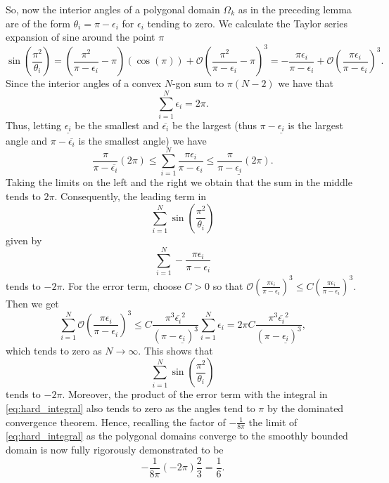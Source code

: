 \documentclass{amsart}
\theoremstyle{definition}
\begin{document}
So, now the interior angles of a polygonal domain $\Omega_k$ as in the preceding lemma are of the form $\theta_i = \pi - \epsilon_i$ for $\epsilon_i$ tending to zero.  We calculate the Taylor series expansion of sine around the point $\pi$ 
\[\sin\left( \frac{\pi^2}{\theta_i} \right)=  \left( \frac{\pi^2}{\pi - \epsilon_i} - \pi \right)(\cos(\pi)) + \mathcal O \left( \frac{\pi^2}{\pi - \epsilon_i} - \pi \right)^3 = - \frac{\pi \epsilon_i}{\pi - \epsilon_i} + \mathcal O \left( \frac{\pi \epsilon_i}{\pi - \epsilon_i}\right)^3.\]
Since the interior angles of a convex $N$-gon sum to $\pi(N-2)$ we have that 
\[ \sum_{i=1} ^N \epsilon_i = 2 \pi.\]
Thus, letting $\underline{\epsilon_i}$ be the smallest and $\overline{\epsilon_i}$ be the largest (thus $\pi - \underline{\epsilon_i}$ is the largest angle and $\pi - \overline{\epsilon_i}$ is the smallest angle) we have 
\[ \frac{\pi}{\pi - \overline{\epsilon_i}} (2\pi) \leq \sum_{i=1}^N \frac{\pi \epsilon_i}{\pi - \epsilon_i} \leq \frac{\pi}{\pi - \underline{\epsilon_i}} (2\pi). \]
Taking the limits on the left and the right we obtain that the sum in the middle tends to $2\pi$.  Consequently, the leading term in 
\[ \sum_{i=1} ^N \sin\left( \frac{\pi^2}{\theta_i} \right) \]
given by 
\[ \sum_{i=1} ^N - \frac{\pi \epsilon_i}{\pi - \epsilon_i}\]
tends to $-2\pi$. For the error term, choose $C > 0$ so that $\mathcal O \left( \frac{\pi \epsilon_i}{\pi - \epsilon_i}\right)^3 \leq C \left(\frac{\pi \epsilon_i}{\pi - \epsilon_i}\right)^3$. Then we get
\begin{equation*}
    \sum_{i=1}^N \mathcal O \left( \frac{\pi \epsilon_i}{\pi - \epsilon_i}\right)^3 \leq C \frac{\pi^3\overline{\epsilon_i}^2}{(\pi-\underline{\epsilon_i})^3} \sum_{i=1}^N \epsilon_i = 2\pi C \frac{\pi^3\overline{\epsilon_i}^2}{(\pi-\underline{\epsilon_i})^3},
\end{equation*}
which tends to zero as $N \to \infty$. This shows that
\begin{equation*}
    \sum_{i = 1}^N \sin\left(\frac{\pi^2}{\theta_i}\right)
\end{equation*}
tends to $-2\pi$.  Moreover, the product of the error term with the integral in \eqref{eq:hard_integral} also tends to zero as the angles tend to $\pi$ by the dominated convergence theorem.  Hence, recalling the factor of $-\frac{1}{8\pi}$ the limit of \eqref{eq:hard_integral} as the polygonal domains converge to the smoothly bounded domain is now fully rigorously demonstrated to be  
\[ - \frac{1}{8\pi} (-2\pi) \frac{2}{3} = \frac 1 6.\]
\end{document}
